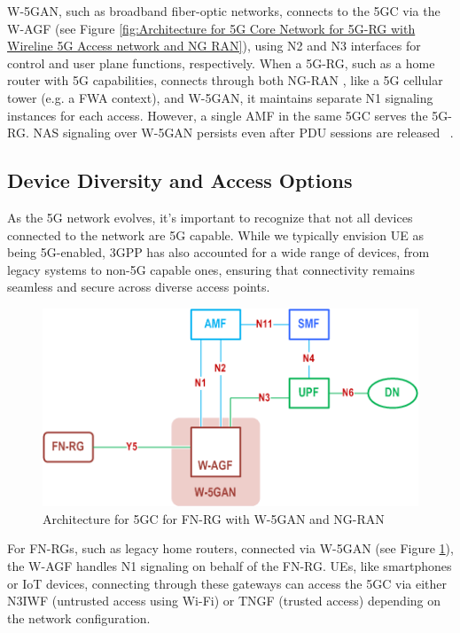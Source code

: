 \ac{W-5GAN}, such as broadband fiber-optic networks, connects to the \ac{5GC} via the \ac{W-AGF} (see Figure \ref{fig:Architecture for 5G Core Network for 5G-RG with Wireline 5G Access network and NG RAN}), using N2 and N3 interfaces for control and user plane functions, respectively. When a \acf{5G-RG}, such as a home router with \ac{5G} capabilities, connects through both \ac{NG-RAN} , like a \ac{5G} cellular tower (e.g. a \ac{FWA} context), and \ac{W-5GAN}, it maintains separate N1 signaling instances for each access. However, a single \ac{AMF} in the same \ac{5GC} serves the \ac{5G-RG}. \ac{NAS} signaling over \ac{W-5GAN} persists even after \acf{PDU} sessions are released ~\cite{23.501-p66}.

\subsection{Device Diversity and Access Options}

As the \ac{5G} network evolves, it's important to recognize that not all devices connected to the network are \ac{5G} capable. While we typically envision \ac{UE} as being \ac{5G}-enabled, \ac{3GPP} has also accounted for a wide range of devices, from legacy systems to non-\ac{5G} capable ones, ensuring that connectivity remains seamless and secure across diverse access points.

\begin{figure}
    \centering
    \includegraphics[width=0.5\linewidth]{figs/Architecture for 5G Core Network for FN-RG with Wireline 5G Access network and NG RAN.png}
    \caption{Architecture for \acs{5GC} for \acs{FN-RG} with \acs{W-5GAN} and \acs{NG-RAN}}
    \label{fig:Architecture for 5G Core Network for FN-RG with Wireline 5G Access network and NG RAN}
\end{figure}

For \acp{FN-RG}, such as legacy home routers, connected via \ac{W-5GAN} (see Figure \ref{fig:Architecture for 5G Core Network for FN-RG with Wireline 5G Access network and NG RAN}), the \ac{W-AGF} handles N1 signaling on behalf of the \ac{FN-RG}. \acp{UE}, like smartphones or \ac{IoT} devices, connecting through these gateways can access the \ac{5GC} via either \ac{N3IWF} (untrusted access using Wi-Fi) or \ac{TNGF} (trusted access) depending on the network configuration.

